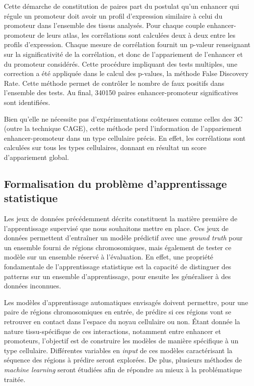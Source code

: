 \documentclass[french]{llncs}
\begin{document}
 Cette démarche de constitution de paires part du postulat qu'un enhancer qui régule un promoteur doit avoir un profil d'expression similaire à celui du promoteur dans l'ensemble des tissus analysés. 
 Pour chaque couple enhancer-promoteur de leurs atlas, les corrélations sont calculées deux à deux entre les profils d'expression. Chaque mesure de corrélation fournit un p-valeur renseignant sur la significativité de la corrélation, et donc de l'appariement de l'enhancer et du promoteur considérés. Cette procédure impliquant des tests multiples, une correction a été appliquée dans le calcul des p-values, la méthode False Discovery Rate. Cette méthode permet de contrôler le nombre de faux positifs dans l'ensemble des tests. Au final, 340150 paires enhancer-promoteur significatives sont identifiées.

Bien qu'elle ne nécessite pas d'expérimentations coûteuses comme celles des 3C (outre la technique CAGE), cette méthode perd l'information de l'appariement enhancer-promoteur dans un type cellulaire précis. En effet, les corrélations sont calculées sur tous les types cellulaires, donnant en résultat un score d'appariement global.

\subsection{Formalisation du problème d'apprentissage statistique}

Les jeux de données précédemment décrits constituent la matière première de l'apprentissage supervisé que nous souhaitons mettre en place. Ces jeux de données permettent d'entraîner un modèle prédictif avec une \textit{ground truth} pour un ensemble fourni de régions chromosomiques, mais également de tester ce modèle sur un ensemble réservé à l'évaluation. En effet, une propriété fondamentale de l'apprentissage statistique est la capacité de distinguer des patterns sur un ensemble d'apprentissage, pour ensuite les généraliser à des données inconnues.

Les modèles d'apprentissage automatiques envisagés doivent permettre, pour une paire de régions chromosomiques en entrée, de prédire si ces régions vont se retrouver en contact dans l'espace du noyau cellulaire ou non. Étant donnée la nature tissu-spécifique de ces interactions, notamment entre enhancer et promoteurs, l'objectif est de construire les modèles de manière spécifique à un type cellulaire. Différentes variables en \textit{input} de ces modèles caractérisant la séquence des régions à prédire seront explorées. De plus, plusieurs méthodes de \textit{machine learning} seront étudiées afin de répondre au mieux à la problématique traitée.
\end{document}
